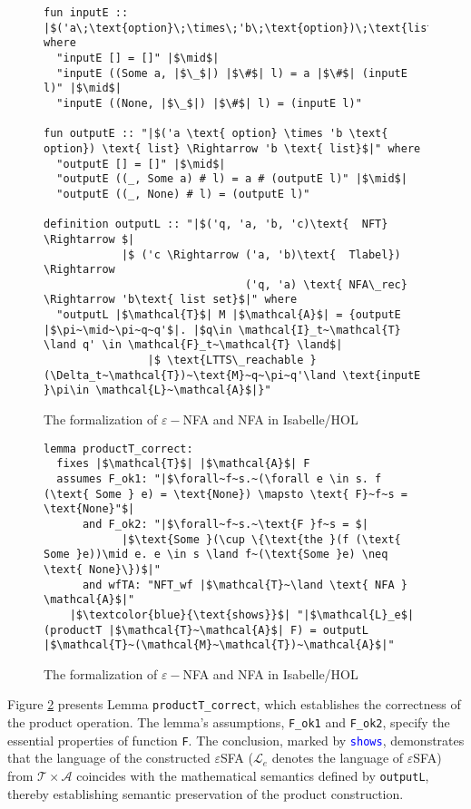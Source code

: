 \documentclass[a4paper,UKenglish,cleveref, autoref, anonymous, thm-restate]{lipics-v2021}
\begin{document}
\begin{figure}[hbt!]
	\begin{lstlisting}
fun inputE :: |$('a\;\text{option}\;\times\;'b\;\text{option})\;\text{list}\;\Rightarrow\;'a\;\text{list}$| where
  "inputE [] = []" |$\mid$|
  "inputE ((Some a, |$\_$|) |$\#$| l) = a |$\#$| (inputE l)" |$\mid$|
  "inputE ((None, |$\_$|) |$\#$| l) = (inputE l)"

fun outputE :: "|$('a \text{ option} \times 'b \text{ option}) \text{ list} \Rightarrow 'b \text{ list}$|" where
  "outputE [] = []" |$\mid$|
  "outputE ((_, Some a) # l) = a # (outputE l)" |$\mid$|
  "outputE ((_, None) # l) = (outputE l)"

definition outputL :: "|$('q, 'a, 'b, 'c)\text{  NFT} \Rightarrow $|
            |$ ('c \Rightarrow ('a, 'b)\text{  Tlabel}) \Rightarrow 
                               ('q, 'a) \text{ NFA\_rec} \Rightarrow 'b\text{ list set}$|" where
  "outputL |$\mathcal{T}$| M |$\mathcal{A}$| = {outputE |$\pi~\mid~\pi~q~q'$|. |$q\in \mathcal{I}_t~\mathcal{T} \land q' \in \mathcal{F}_t~\mathcal{T} \land$|
                |$ \text{LTTS\_reachable }(\Delta_t~\mathcal{T})~\text{M}~q~\pi~q'\land \text{inputE }\pi\in \mathcal{L}~\mathcal{A}$|}" 
	\end{lstlisting}
\caption{The formalization of $\varepsilon-$NFA and NFA in Isabelle/HOL}
\label{fig-def-output}
\end{figure}


\begin{figure}[hbt!]
	\begin{lstlisting}
lemma productT_correct:
  fixes |$\mathcal{T}$| |$\mathcal{A}$| F
  assumes F_ok1: "|$\forall~f~s.~(\forall e \in s. f (\text{ Some } e) = \text{None}) \mapsto \text{ F}~f~s = \text{None}"$|
      and F_ok2: "|$\forall~f~s.~\text{F }f~s = $|
            |$\text{Some }(\cup \{\text{the }(f (\text{ Some }e))\mid e. e \in s \land f~(\text{Some }e) \neq \text{ None}\})$|"
      and wfTA: "NFT_wf |$\mathcal{T}~\land \text{ NFA } \mathcal{A}$|"
    |$\textcolor{blue}{\text{shows}}$| "|$\mathcal{L}_e$| (productT |$\mathcal{T}~\mathcal{A}$| F) = outputL |$\mathcal{T}~(\mathcal{M}~\mathcal{T})~\mathcal{A}$|"

	\end{lstlisting}
\caption{The formalization of $\varepsilon-$NFA and NFA in Isabelle/HOL}
\label{fig-def-product-correct}
\end{figure}

Figure \ref{fig-def-product-correct} presents Lemma \texttt{productT\_correct}, which establishes the correctness of the product operation. The lemma's assumptions, \texttt{F\_ok1} and \texttt{F\_ok2}, specify the essential properties of function \texttt{F}. The conclusion, marked by \textcolor{blue}{\texttt{shows}}, demonstrates that the language of the constructed $\varepsilon$SFA ($\mathcal{L}_e$ denotes the language of $\varepsilon$SFA) from $\mathcal{T} \times \mathcal{A}$ coincides with the mathematical semantics defined by \texttt{outputL}, thereby establishing semantic preservation of the product construction.
\end{document}
